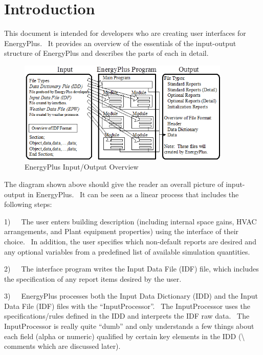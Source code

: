\chapter{Introduction}\label{introduction}

This document is intended for developers who are creating user interfaces for EnergyPlus.~ It provides an overview of the essentials of the input-output structure of EnergyPlus and describes the parts of each in detail.

\begin{figure}[hbtp] %
\centering
\includegraphics[width=0.9\textwidth, height=0.9\textheight, keepaspectratio=true]{media/image001.png}
\caption{EnergyPlus Input/Output Overview \protect \label{fig:energyplus-inputoutput-overview}}
\end{figure}

The diagram shown above should give the reader an overall picture of input-output in EnergyPlus.~ It can be seen as a linear process that includes the following steps:

1)~~~The user enters building description (including internal space gains, HVAC arrangements, and Plant equipment properties) using the interface of their choice.~ In addition, the user specifies which non-default reports are desired and any optional variables from a predefined list of available simulation quantities.

2)~~~The interface program writes the Input Data File (IDF) file, which includes the specification of any report items desired by the user.

3)~~~EnergyPlus processes both the Input Data Dictionary (IDD) and the Input Data File (IDF) files with the ``InputProcessor''.~ The InputProcessor uses the specifications/rules defined in the IDD and interprets the IDF raw data.~ The InputProcessor is really quite ``dumb'' and only understands a few things about each field (alpha or numeric) qualified by certain key elements in the IDD (\textbackslash{} comments which are discussed later).

